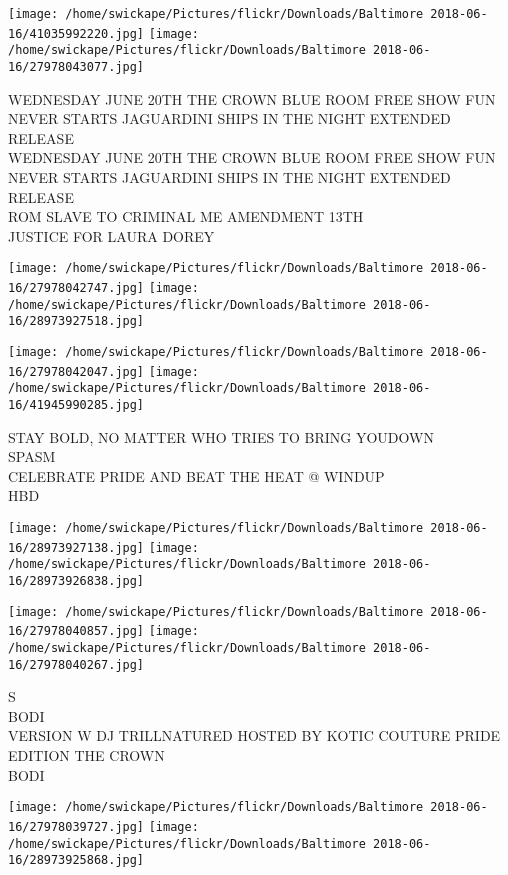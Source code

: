 \documentclass[10pt,letterpaper]{article}
\begin{document}
\texttt{[image: /home/swickape/Pictures/flickr/Downloads/Baltimore 2018-06-16/41035992220.jpg]}
\texttt{[image: /home/swickape/Pictures/flickr/Downloads/Baltimore 2018-06-16/27978043077.jpg]}

WEDNESDAY JUNE 20TH THE CROWN BLUE ROOM FREE SHOW FUN NEVER STARTS JAGUARDINI SHIPS IN THE NIGHT EXTENDED RELEASE\\
WEDNESDAY JUNE 20TH THE CROWN BLUE ROOM FREE SHOW FUN NEVER STARTS JAGUARDINI SHIPS IN THE NIGHT EXTENDED RELEASE\\
ROM SLAVE TO CRIMINAL ME AMENDMENT 13TH\\
JUSTICE FOR LAURA DOREY\\
\pagebreak

\texttt{[image: /home/swickape/Pictures/flickr/Downloads/Baltimore 2018-06-16/27978042747.jpg]}
\texttt{[image: /home/swickape/Pictures/flickr/Downloads/Baltimore 2018-06-16/28973927518.jpg]}

\texttt{[image: /home/swickape/Pictures/flickr/Downloads/Baltimore 2018-06-16/27978042047.jpg]}
\texttt{[image: /home/swickape/Pictures/flickr/Downloads/Baltimore 2018-06-16/41945990285.jpg]}

STAY BOLD, NO MATTER WHO TRIES TO BRING YOUDOWN\\
SPASM\\
CELEBRATE PRIDE AND BEAT THE HEAT @ WINDUP\\
HBD\\
\pagebreak

\texttt{[image: /home/swickape/Pictures/flickr/Downloads/Baltimore 2018-06-16/28973927138.jpg]}
\texttt{[image: /home/swickape/Pictures/flickr/Downloads/Baltimore 2018-06-16/28973926838.jpg]}

\texttt{[image: /home/swickape/Pictures/flickr/Downloads/Baltimore 2018-06-16/27978040857.jpg]}
\texttt{[image: /home/swickape/Pictures/flickr/Downloads/Baltimore 2018-06-16/27978040267.jpg]}

S\\
BODI\\
VERSION W DJ TRILLNATURED HOSTED BY KOTIC COUTURE PRIDE EDITION THE CROWN\\
BODI\\
\pagebreak

\texttt{[image: /home/swickape/Pictures/flickr/Downloads/Baltimore 2018-06-16/27978039727.jpg]}
\texttt{[image: /home/swickape/Pictures/flickr/Downloads/Baltimore 2018-06-16/28973925868.jpg]}
\end{document}
